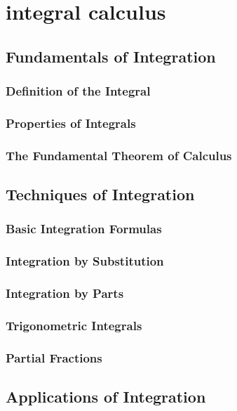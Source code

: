 \chapterspaceabove{6.75cm} 
\chapterspacebelow{7.25cm} 
\chapter{integral calculus}

\section{Fundamentals of Integration}
    \subsection{Definition of the Integral}
    \subsection{Properties of Integrals}
    \subsection{The Fundamental Theorem of Calculus}

\section{Techniques of Integration}
    \subsection{Basic Integration Formulas}
    \subsection{Integration by Substitution}
    \subsection{Integration by Parts}
    \subsection{Trigonometric Integrals}
    \subsection{Partial Fractions}

\section{Applications of Integration}
